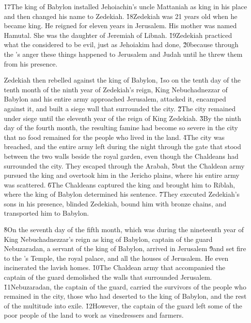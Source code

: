 \v{17}The king of Babylon installed Jehoiachin's uncle Mattaniah as king in his place and then changed his name to Zedekiah. \v{18}Zedekiah was 21 years old when he became king. He reigned for eleven years in Jerusalem. His mother was named Hamutal. She was the daughter of Jeremiah of Libnah. \v{19}Zedekiah practiced what the  considered to be evil, just as Jehoiakim had done, \v{20}because through the 's anger these things happened to Jerusalem and Judah until he threw them from his presence.

Zedekiah then rebelled against the king of Babylon,
\v{1}so on the tenth day of the tenth month of the ninth year of Zedekiah's reign, King Nebuchadnezzar of Babylon and his entire army approached Jerusalem, attacked it, encamped against it, and built a siege wall that surrounded the city. \v{2}The city remained under siege until the eleventh year of the reign of King Zedekiah. \v{3}By the ninth day of the fourth month, the resulting famine had become so severe in the city that no food remained for the people who lived in the land. \v{4}The city was breached, and the entire army left during the night through the gate that stood between the two walls beside the royal garden, even though the Chaldeans had surrounded the city. They escaped through the Arabah, \v{5}but the Chaldean army pursued the king and overtook him in the Jericho plains, where his entire army was scattered. \v{6}The Chaldeans captured the king and brought him to Riblah, where the king of Babylon determined his sentence. \v{7}They executed Zedekiah's sons in his presence, blinded Zedekiah, bound him with bronze chains, and transported him to Babylon.

\v{8}On the seventh day of the fifth month, which was during the nineteenth year of King Nebuchadnezzar's reign as king of Babylon, captain of the guard Nebuzaradan, a servant of the king of Babylon, arrived in Jerusalem \v{9}and set fire to the 's Temple, the royal palace, and all the houses of Jerusalem. He even incinerated the lavish homes. \v{10}The Chaldean army that accompanied the captain of the guard demolished the walls that surrounded Jerusalem. \v{11}Nebuzaradan, the captain of the guard, carried the survivors of the people who remained in the city, those who had deserted to the king of Babylon, and the rest of the multitude into exile. \v{12}However, the captain of the guard left some of the poor people of the land to work as vinedressers and farmers.

